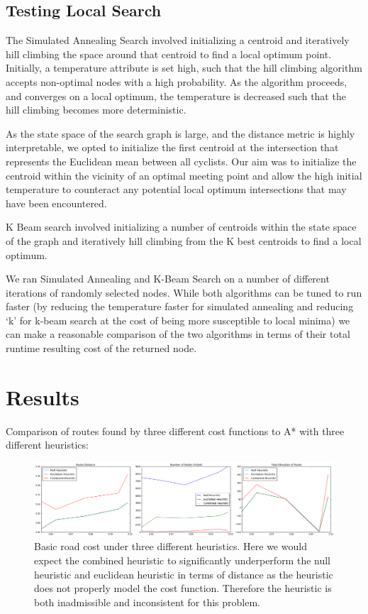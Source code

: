 \documentclass[11pt]{article}
\begin{document}
\subsection{Testing Local Search}
The Simulated Annealing Search involved initializing a centroid and iteratively hill climbing the space around that centroid to find a local optimum point. Initially, a temperature attribute is set high, such that the hill climbing algorithm accepts non-optimal nodes with a high probability. As the algorithm proceeds, and converges on a local optimum, the temperature is decreased such that the hill climbing becomes more deterministic.
\par
As the state space of the search graph is large, and the distance metric is highly interpretable, we opted to initialize the first centroid at the intersection that represents the Euclidean mean between all cyclists. Our aim was to initialize the centroid within the vicinity of an optimal meeting point and allow the high initial temperature to counteract any potential local optimum intersections that may have been encountered.
\par
K Beam search involved initializing a number of centroids within the state space of the graph and iteratively hill climbing from the K best centroids to find a local optimum.
\par
We ran Simulated Annealing and K-Beam Search on a number of different iterations of randomly selected nodes. While both algorithms can be tuned to run faster (by reducing the temperature faster for simulated annealing and reducing `k' for k-beam search at the cost of being more susceptible to local minima) we can make a reasonable comparison of the two algorithms in terms of their total runtime resulting cost of the returned node.

\section{Results}\label{results}

Comparison of routes found by three different cost functions to A* with three different heuristics: \\

\begin{figure}[H]
\caption{Basic road cost under three different heuristics. Here we would expect the combined heuristic to significantly underperform the null heuristic and euclidean heuristic in terms of distance as the heuristic does not properly model the cost function. Therefore the heuristic is both inadmissible and inconsistent for this problem. }
\includegraphics[width=1\textwidth]{../images/cost_1.png}
\end{figure}
\end{document}
